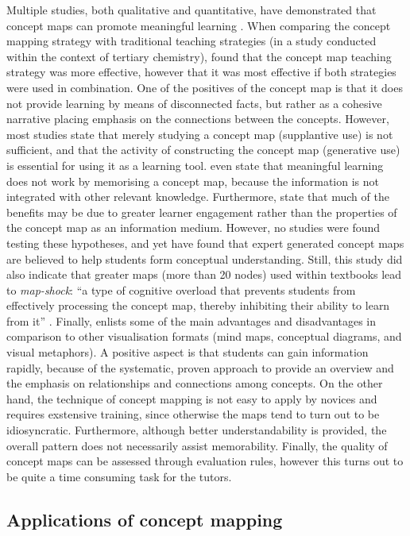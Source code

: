 Multiple studies, both qualitative and quantitative, have demonstrated that concept maps can promote meaningful learning \cite{canas, hwang2, nesbit, subramaniam}. When comparing the concept mapping strategy with traditional teaching strategies (in a study conducted within the context of tertiary chemistry),  found that the concept map teaching strategy was more effective, however that it was most effective if both strategies were used in combination. One of the positives of the concept map is that it does not provide learning by means of disconnected facts, but rather as a cohesive narrative placing emphasis on the connections between the concepts. However, most studies state that merely studying a concept map (supplantive use) is not sufficient, and that the activity of constructing the concept map (generative use) is essential for using it as a learning tool.  even state that meaningful learning does not work by memorising a concept map, because the information is not integrated with other relevant knowledge. Furthermore,  state that much of the benefits may be due to greater learner engagement rather than the properties of the concept map as an information medium. However, no studies were found testing these hypotheses, and yet  have found that expert generated concept maps are believed to help students form conceptual understanding. Still, this study did also indicate that greater maps (more than 20 nodes) used within textbooks lead to \emph{map-shock}: ``a type of cognitive overload that prevents students from effectively processing the concept map, thereby inhibiting their ability to learn from it'' \cite[p.~3]{moore}. Finally,  enlists some of the main advantages and disadvantages in comparison to other visualisation formats (mind maps, conceptual diagrams, and visual metaphors). A positive aspect is that students can gain information rapidly, because of the systematic, proven approach to provide an overview and the emphasis on relationships and connections among concepts. On the other hand, the technique of concept mapping is not easy to apply by novices and requires exstensive training, since otherwise the maps tend to turn out to be idiosyncratic. Furthermore, although better understandability is provided, the overall pattern does not necessarily assist memorability. Finally, the quality of concept maps can be assessed through evaluation rules, however this turns out to be quite a time consuming task for the tutors.


\subsection{Applications of concept mapping}

